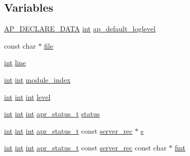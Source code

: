 \subsection*{Variables}
\begin{DoxyCompactItemize}
\item 
\hyperlink{ap__config_8h_a0bb4c3adf74510a0dcdad5b125725fe0}{A\+P\+\_\+\+D\+E\+C\+L\+A\+R\+E\+\_\+\+D\+A\+TA} \hyperlink{pcre_8txt_a42dfa4ff673c82d8efe7144098fbc198}{int} \hyperlink{group__APACHE__CORE__LOG_ga3306700b5a77a80df513749df63d1613}{ap\+\_\+default\+\_\+loglevel}
\item 
const char $\ast$ \hyperlink{group__APACHE__CORE__LOG_ga52f984475a42d9227fcbfd159db35676}{file}
\item 
\hyperlink{pcre_8txt_a42dfa4ff673c82d8efe7144098fbc198}{int} \hyperlink{group__APACHE__CORE__LOG_gaa843820216dea79b53a16310cb08e8dd}{line}
\item 
\hyperlink{pcre_8txt_a42dfa4ff673c82d8efe7144098fbc198}{int} \hyperlink{pcre_8txt_a42dfa4ff673c82d8efe7144098fbc198}{int} \hyperlink{group__APACHE__CORE__LOG_ga8347f4481f59a55b548b6a691741733a}{module\+\_\+index}
\item 
\hyperlink{pcre_8txt_a42dfa4ff673c82d8efe7144098fbc198}{int} \hyperlink{pcre_8txt_a42dfa4ff673c82d8efe7144098fbc198}{int} \hyperlink{pcre_8txt_a42dfa4ff673c82d8efe7144098fbc198}{int} \hyperlink{group__APACHE__CORE__LOG_ga46c1c4bc138aad1e20504bbee34f35a7}{level}
\item 
\hyperlink{pcre_8txt_a42dfa4ff673c82d8efe7144098fbc198}{int} \hyperlink{pcre_8txt_a42dfa4ff673c82d8efe7144098fbc198}{int} \hyperlink{pcre_8txt_a42dfa4ff673c82d8efe7144098fbc198}{int} \hyperlink{group__apr__errno_gaa5105fa83cc322f09382292db8b47593}{apr\+\_\+status\+\_\+t} \hyperlink{group__APACHE__CORE__LOG_gaa67063cfb88d04cd82302912b2c85838}{status}
\item 
\hyperlink{pcre_8txt_a42dfa4ff673c82d8efe7144098fbc198}{int} \hyperlink{pcre_8txt_a42dfa4ff673c82d8efe7144098fbc198}{int} \hyperlink{pcre_8txt_a42dfa4ff673c82d8efe7144098fbc198}{int} \hyperlink{group__apr__errno_gaa5105fa83cc322f09382292db8b47593}{apr\+\_\+status\+\_\+t} const \hyperlink{structserver__rec}{server\+\_\+rec} $\ast$ \hyperlink{group__APACHE__CORE__LOG_gac4d70082e9974ebc2dabf813f28a90e6}{s}
\item 
\hyperlink{pcre_8txt_a42dfa4ff673c82d8efe7144098fbc198}{int} \hyperlink{pcre_8txt_a42dfa4ff673c82d8efe7144098fbc198}{int} \hyperlink{pcre_8txt_a42dfa4ff673c82d8efe7144098fbc198}{int} \hyperlink{group__apr__errno_gaa5105fa83cc322f09382292db8b47593}{apr\+\_\+status\+\_\+t} const \hyperlink{structserver__rec}{server\+\_\+rec} const char $\ast$ \hyperlink{group__APACHE__CORE__LOG_gaacca67646a119f459e8e6eecb7f5e7ac}{fmt}

\end{DoxyCompactItemize}

